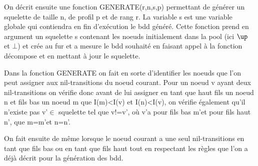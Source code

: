 \documentclass[french]{article}
\begin{document}
On décrit ensuite une fonction GENERATE(r,n,s,p) permettant de générer un squelette de taille n, de profil p et de rang r. La variable s est une variable globale qui contiendra en fin d'exécution le bdd généré.
Cette fonction prend en argument un squelette s contenant les noeuds initialement dans la pool (ici \(\up\) et \(\bot\)) et crée au fur et a mesure le bdd souhaité en faisant appel à la fonction décompose et en mettant à jour le squelette.

\begin{algorithm}
  \begin{algorithmic}[1]
    \Statex
            \State {}
                \State {}
                \State {}
            \EndIf
            \Else
                \State {}
                \State {}
                        \EndIf
                    \Else
                        \State {}
                \EndIf
            \EndIf
            \State {}
            \State {}
  \end{algorithmic}
\end{algorithm}


Dans la fonction GENERATE on fait en sorte d'identifier les noeuds que l'on peut assigner aux nil-transitions du noeud courant. Pour un noeud v ayant deux nil-transitions on vérifie donc avant de lui assigner en tant que haut fils un noeud n et fils bas un noeud m que I(m)<I(v) et I(n)<I(v), on vérifie également qu'il n'existe pas v\textquoteright \(\in\) squelette tel que v!=v\textquoteright, où v\textquoteright a pour fils bas m\textquoteright et pour fils haut n\textquoteright, que m=m\textquoteright et n=n\textquoteright.

On fait ensuite de même lorsque le noeud courant a une seul nil-transitions en tant que fils bas ou en tant que fils haut tout en respectant les règles que l'on a déjà décrit pour la génération des bdd. 
\end{document}
